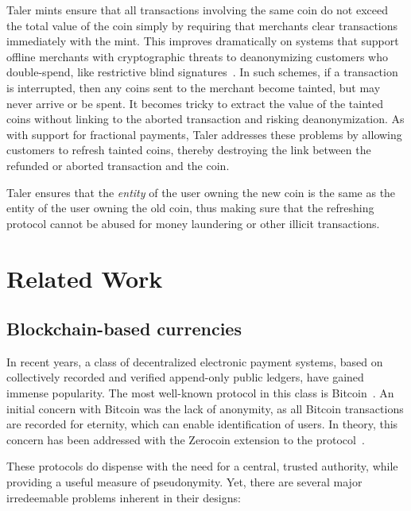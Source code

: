 \documentclass{llncs}
\begin{document}
Taler mints ensure that all transactions involving the same coin
do not exceed the total value of the coin simply by
requiring that merchants clear transactions immediately with the mint.
This improves dramatically on systems that support offline merchants with
cryptographic threats to deanonymizing customers who double-spend, like
restrictive blind signatures~\cite{brands1993efficient}.
In such schemes, if a transaction is interrupted, then any coins sent to
the merchant become tainted, but may never arrive or be spent.
It becomes tricky to extract the value of the tainted coins without linking
to the aborted transaction and risking deanonymization.
As with support for fractional payments, Taler addresses these problems by
allowing customers to refresh tainted coins, thereby destroying the link
between the refunded or aborted transaction and the coin.

Taler ensures that the {\em entity} of the user owning the new coin is
the same as the entity of the user owning the old coin, thus making
sure that the refreshing protocol cannot be abused for money
laundering or other illicit transactions.


\section{Related Work}

\subsection{Blockchain-based currencies}

In recent years, a class of decentralized electronic payment systems,
based on collectively recorded and verified append-only public
ledgers, have gained immense popularity.  The most well-known protocol
in this class is Bitcoin~\cite{nakamoto2008bitcoin}.  An initial
concern with Bitcoin was the lack of anonymity, as all Bitcoin
transactions are recorded for eternity, which can enable
identification of users.  In theory, this concern has been addressed
with the Zerocoin extension to the protocol~\cite{miers2013zerocoin}.

These protocols do dispense with the need for a central, trusted
authority, while providing a useful measure of pseudonymity.
Yet, there are several major irredeemable problems inherent in their designs:
\end{document}
